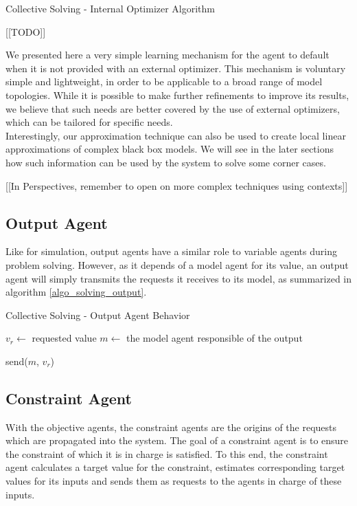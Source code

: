 \begin{algorithm}
\caption{Collective Solving - Internal Optimizer Algorithm}
\label{algo_solving_internaloptim}
	[[TODO]]\;
\end{algorithm}

We presented here a very simple learning mechanism for the agent to default when it is not provided with an external optimizer. This mechanism is voluntary simple and lightweight, in order to be applicable to a broad range of model topologies. While it is possible to make further refinements to improve its results, we believe that such needs are better covered by the use of external optimizers, which can be tailored for specific needs.\\
Interestingly, our approximation technique can also be used to create local linear approximations of complex black box models. We will see in the later sections how such information can be used by the system to solve some corner cases.

[[In Perspectives, remember to open on more complex techniques using contexts]]

\subsection{Output Agent}

Like for simulation, output agents have a similar role to variable agents during problem solving. However, as it depends of a model agent for its value, an output agent will simply transmits the requests it receives to its model, as summarized in algorithm \ref{algo_solving_output}.

\begin{algorithm}
\caption{Collective Solving - Output Agent Behavior}
\label{algo_solving_output}

	$v_r \leftarrow$ requested value\;
	$m \leftarrow$ the model agent responsible of the output \;
	
	send($m$, $v_r$) \;
	
\end{algorithm}

\subsection{Constraint Agent}

With the objective agents, the constraint agents are the origins of the requests which are propagated into the system. The goal of a constraint agent is to ensure the constraint of which it is in charge is satisfied. To this end, the constraint agent calculates a target value for the constraint, estimates corresponding target values for its inputs and sends them as requests to the agents in charge of these inputs.

